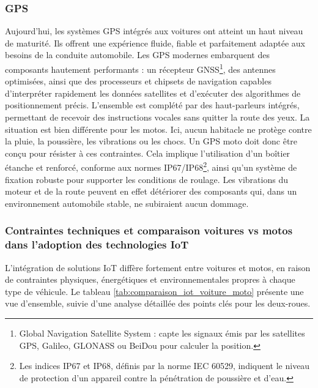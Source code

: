 \subsubsection{GPS}
Aujourd’hui, les systèmes GPS intégrés aux voitures ont atteint un haut niveau de maturité. Ils offrent une expérience fluide, fiable et parfaitement adaptée aux besoins de la conduite automobile. Les GPS modernes embarquent des composants hautement performants : un récepteur GNSS\footnote{Global Navigation Satellite System : capte les signaux émis par les satellites GPS, Galileo, GLONASS ou BeiDou pour calculer la position.}, des antennes optimisées, ainsi que des processeurs et chipsets de navigation capables d’interpréter rapidement les données satellites et d’exécuter des algorithmes de positionnement précis. L’ensemble est complété par des haut-parleurs intégrés, permettant de recevoir des instructions vocales sans quitter la route des yeux.
La situation est bien différente pour les motos. Ici, aucun habitacle ne protège contre la pluie, la poussière, les vibrations ou les chocs. Un GPS moto doit donc être conçu pour résister à ces contraintes. Cela implique l’utilisation d’un boîtier étanche et renforcé, conforme aux normes IP67/IP68\footnote{Les indices IP67 et IP68, définis par la norme IEC 60529, indiquent le niveau de protection d’un appareil contre la pénétration de poussière et d’eau.}, ainsi qu’un système de fixation robuste pour supporter les conditions de roulage. Les vibrations du moteur et de la route peuvent en effet détériorer des composants qui, dans un environnement automobile stable, ne subiraient aucun dommage.

\subsubsection{Contraintes techniques et comparaison voitures vs motos dans l’adoption des technologies IoT}

L’intégration de solutions IoT diffère fortement entre voitures et motos, en raison de contraintes physiques, énergétiques et environnementales propres à chaque type de véhicule. Le tableau \ref{tab:comparaison_iot_voiture_moto} présente une vue d’ensemble, suivie d’une analyse détaillée des points clés pour les deux-roues.

